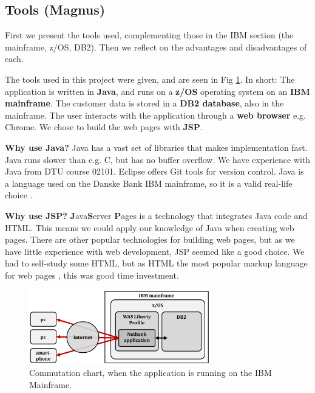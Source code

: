 \subsection{Tools (Magnus)}\label{sec:tools}

First we present the tools used, complementing those in the IBM section (the mainframe, z/OS, DB2). Then we reflect on the advantages and disadvantages of each. 

The tools used in this project were given, and are seen in Fig \ref{fig:communication_external}. In short: The application is written in \textbf{Java}, and runs on a \textbf{z/OS} operating system on an \textbf{IBM mainframe}. The customer data is stored in a \textbf{DB2 database}, also in the mainframe. The user interacts with the application through a \textbf{web browser} e.g. Chrome. We chose to build the web pages with \textbf{JSP}.

\textbf{Why use Java?} Java has a vast set of libraries that makes implementation fast. Java runs slower than e.g. C, but has no buffer overflow. We have experience with Java from DTU course 02101. Eclipse offers Git tools for version control. Java is a language used on the Danske Bank IBM mainframe, so it is a valid real-life choice \cite{danskebank_java}.

 

\textbf{Why use JSP?} \textbf{J}ava\textbf{S}erver \textbf{P}ages is a technology that integrates Java code and HTML. This means we could apply our knowledge of Java when creating web pages. There are other popular technologies for building web pages, but as we have little experience with web development, JSP seemed like a good choice. We had to self-study some HTML, but as HTML the most popular markup language for web pages \cite{html_most_used}, this was good time investment.

\begin{figure}[H]
\centering
\includegraphics[width = 0.7\textwidth]{figures/communication1.pdf}
\caption{Commutation chart, when the application is running on the IBM Mainframe.}\label{fig:communication_external}
\end{figure}

